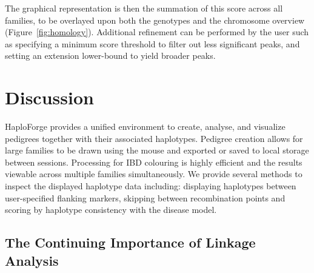 \documentclass{bioinfo}
\numberwithin{equation}{section}
\def\haplo{{HaploForge}}
\newcommand{\changes}[1]{{\color{red}{#1}}}
\begin{document}
\begin{methods}
\vspace{-10pt}
The graphical representation is then the summation of this score across all families, to be overlayed upon both the genotypes and the chromosome overview (Figure~\ref{fig:homology}). Additional refinement can be performed by the user such as specifying a minimum score threshold to filter out less significant peaks, and setting an extension lower-bound to yield broader peaks.

\changes{The purpose of the scoring function is to identify extended haplotypes by calculating IBD between alleles for individuals within the same family and combining it with an IBS score across different families. In this way, founder effects will be highlighted as common peaks across selected individuals.}

\end{methods}

\section{Discussion}

\haplo{} provides a unified environment to create, analyse, and visualize pedigrees together with their associated haplotypes. Pedigree creation allows for large families to be drawn using the mouse and exported or saved to local storage between sessions. Processing for IBD colouring is highly efficient and the results viewable across multiple families simultaneously. We provide several methods to inspect the displayed haplotype data including: displaying haplotypes between user-specified flanking markers, skipping between recombination points and scoring by haplotype consistency with the disease model.


\subsection{The Continuing Importance of Linkage Analysis}

\changes{The importance of genetic linkage analysis is often understated in the era of high-throughput sequencing. While positive logarithm-of-odds (LOD) scores can help to pinpoint loci of interest, negative LOD scores from under-powered linkage studies can be used to exclude large areas of the genome.}

\changes{Combining regions of interest outlined by linkage studies can filter out a majority of genetic variants found with sequence analysis. Indeed, linkage analysis paired with haplotype reconstruction is still extremely valuable in this respect, especially in the detection of founder effects across multiple families.}
\end{document}

